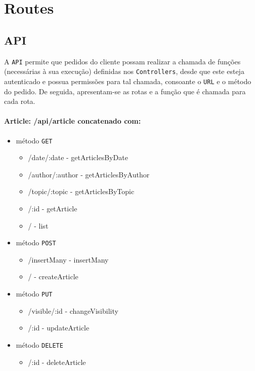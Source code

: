 \section{Routes}\label{c:routes}

\subsection{API}
A \texttt{API} permite que pedidos do cliente possam realizar a chamada de funções (necessárias à sua execução) definidas nos \texttt{Controllers}, desde que este esteja autenticado e possua permissões para tal chamada, consoante o \texttt{URL} e o método do pedido.
De seguida, apresentam-se as rotas e a função que é chamada para cada rota.

\paragraph{Article: /api/article concatenado com:} 
        \begin{itemize}
            \item método \texttt{GET}
                \begin{itemize}
                    \item /date/:date - getArticlesByDate
                    \item /author/:author - getArticlesByAuthor
                    \item /topic/:topic - getArticlesByTopic
                    \item /:id - getArticle
                    \item / - list
                \end{itemize}
            \item método \texttt{POST}
                \begin{itemize}
                    \item /insertMany - insertMany
                    \item / - createArticle
                \end{itemize}
            \item método \texttt{PUT}
                \begin{itemize}
                    \item /visible/:id - changeVisibility
                    \item /:id - updateArticle
                \end{itemize}
            \item método \texttt{DELETE}
                \begin{itemize}
                    \item /:id - deleteArticle
                \end{itemize}
        \end{itemize}

